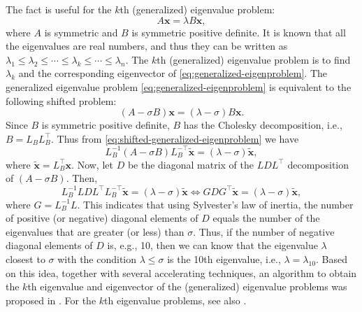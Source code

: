 {The fact is useful for the $k$th (generalized) eigenvalue problem:}
\begin{equation}\label{eq:generalized-eigenproblem}A\bm x=\lambda B\bm x,\end{equation}
{where $A$ is symmetric and $B$ is symmetric positive definite. It is known that all the eigenvalues are real numbers, and thus they can be written as $\lambda_1\le\lambda_2\le\cdots\le\lambda_k\le\cdots\le\lambda_n$. The $k$th (generalized) eigenvalue problem is to find $\lambda_k$ and the corresponding eigenvector of \eqref{eq:generalized-eigenproblem}. The generalized eigenvalue problem \eqref{eq:generalized-eigenproblem} is equivalent to the following shifted problem:}
\begin{equation}\label{eq:shifted-generalized-eigenproblem}(A-\sigma B)\bm x=(\lambda-\sigma)B\bm x.\end{equation}
{Since $B$ is symmetric positive definite, $B$ has the Cholesky decomposition, i.e., $B=L_BL_B^\top$. Thus from \eqref{eq:shifted-generalized-eigenproblem} we have}
\[
L_B^{-1}(A-\sigma B)L_B^{-\top}\tilde{\bm x}=(\lambda-\sigma)\tilde{\bm x},
\]
{where $\tilde{\bm x}=L_B^\top\bm x$. Now, let $D$ be the diagonal matrix of the $LDL^\top$ decomposition of $(A-\sigma B)$. Then,}
\[
L_B^{-1}LDL^\top L_B^{-\top}\tilde{\bm x}=(\lambda-\sigma)\tilde{\bm x}
\iff GDG^\top\tilde{\bm x}=(\lambda-\sigma)\tilde{\bm x},
\]
{where $G=L_B^{-1}L$. This indicates that using Sylvester's law of inertia, the number of positive (or negative) diagonal elements of $D$ equals the number of the eigenvalues that are greater (or less) than $\sigma$. Thus, if the number of negative diagonal elements of $D$ is, e.g., 10, then we can know that the eigenvalue $\lambda$ closest to $\sigma$ with the condition $\lambda\le\sigma$ is the 10th eigenvalue, i.e., $\lambda=\lambda_{10}$. Based on this idea, together with several accelerating techniques, an algorithm to obtain the $k$th eigenvalue and eigenvector of the (generalized) eigenvalue problems was proposed in . For the $k$th eigenvalue problems, see also .}
